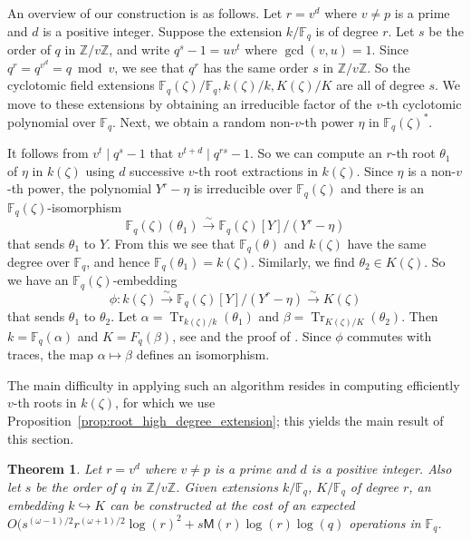 \documentclass{mcom-l}
\theoremstyle{plain}
\newtheorem{theorem}{Theorem}
\theoremstyle{definition}
\DeclareMathOperator{\trace}{Tr} %
\newcommand{\Z}{\ensuremath{\mathbb{Z}}}
\newcommand{\F}{\ensuremath{\mathbb{F}}}
\newcommand{\MM}{\ensuremath{\mathsf{M}}}
\newcounter{algorithm}
\begin{document}
An overview of our construction is as follows. Let $r = v^d$ where $v \ne p$ is a 
prime and $d$ is a positive integer. Suppose the extension $k/\F_q$ is of degree $r$. Let $s$ be 
the order of $q$ in $\Z / v\Z$, and write $q^s - 1 = uv^t$ where $\gcd(v, u) = 1$. Since $q^r = 
q^{v^d} = q \bmod v$, we see that $q^r$ has the same order $s$ in $\Z / v\Z$. So the cyclotomic 
field extensions $\F_q(\zeta) / \F_q, k(\zeta) / k, K(\zeta) / K$ are all of degree $s$. We move to 
these extensions by obtaining an irreducible factor of the $v$-th cyclotomic polynomial over 
$\F_q$. Next, we obtain a random non-$v$-th power $\eta$ in $\F_q(\zeta)^*$.

It follows from $v^t \mid q^s - 1$ that $v^{t + d} \mid q^{rs} - 1$. So we can compute an $r$-th 
root $\theta_1$ of $\eta$ in $k(\zeta)$ using $d$ successive $v$-th root extractions in $k(\zeta)$. 
Since $\eta$ is a non-$v$-th power, the polynomial $Y^r - \eta$ is irreducible over $\F_q(\zeta)$ 
and there is an $\F_q(\zeta)$-isomorphism 
\[ \F_q(\zeta)(\theta_1) \xrightarrow{\sim} \F_q(\zeta)[Y] / (Y^r - \eta) \]
that sends $\theta_1$ to $Y$. From this we see that $\F_q(\theta)$ and $k(\zeta)$ have the same 
degree over $\F_q$, and hence $\F_q(\theta_1) = k(\zeta)$. Similarly, we find $\theta_2 \in 
K(\zeta)$. So we have an $\F_q(\zeta)$-embedding
\[ \phi: k(\zeta) \xrightarrow{\sim} \F_q(\zeta)[Y] / (Y^r - \eta) \xrightarrow{\sim} K(\zeta) \]
that sends $\theta_1$ to $\theta_2$. Let $\alpha = \trace_{k(\zeta) / k}(\theta_1)$ and $\beta = 
\trace_{K(\zeta) / K}(\theta_2)$. Then $k = \F_q(\alpha)$ and $K = F_q(\beta)$, see \cite[Algorithm 
13]{shoup93} and the proof of \cite[Theorem 2.1]{Shoup90}. Since $\phi$ commutes with traces, the 
map $\alpha\mapsto\beta$ defines an isomorphism.

The main difficulty in applying such an algorithm resides in computing efficiently $v$-th roots in 
$k(\zeta)$, for which we use Proposition~\ref{prop:root_high_degree_extension}; this yields the 
main result of this section.
\begin{theorem}
	\label{theorem:isom-root}
	Let $r = v^d$ where $v \ne p$ is a prime and $d$ is a positive integer. Also let $s$ be the 
	order of $q$ in $\Z / v\Z$. Given extensions $k/\F_q$, $K/\F_q$ of degree $r$, an
        embedding $k\hookrightarrow K$ can be constructed at the cost of 
an expected $O(s^{(\omega-1)/2}r^{(\omega+1)/2}\log(r)^2 + s\MM(r)\log(r)\log(q)$
operations in $\F_q$.
\end{theorem}
\end{document}
